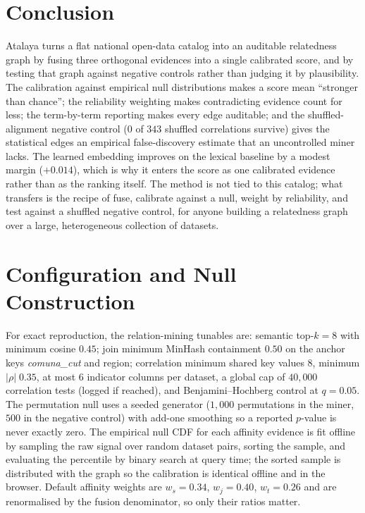 \documentclass[journal]{IEEEtran}
\newcommand{\dsname}[1]{\textit{#1}}
\begin{document}
\section{Conclusion}

Atalaya turns a flat national open-data catalog into an auditable relatedness graph by fusing three orthogonal
evidences into a single calibrated score, and by testing that graph against negative controls rather than
judging it by plausibility. The calibration against empirical null distributions makes a score mean ``stronger
than chance''; the reliability weighting makes contradicting evidence count for less; the term-by-term reporting
makes every edge auditable; and the shuffled-alignment negative control ($0$ of $343$ shuffled correlations
survive) gives the statistical edges an empirical false-discovery estimate that an uncontrolled miner lacks. The
learned embedding improves on the lexical baseline by a modest margin ($+0.014$), which is why it enters the score
as one calibrated evidence rather than as the ranking itself. The method is not tied to this catalog; what
transfers is the recipe of fuse, calibrate against a null, weight by reliability, and test against a shuffled
negative control, for anyone building a relatedness graph over a large, heterogeneous collection of datasets.

\appendices

\section{Configuration and Null Construction}\label{app:config}

For exact reproduction, the relation-mining tunables are: semantic top-$k=8$ with minimum cosine $0.45$; join
minimum MinHash containment $0.50$ on the anchor keys \dsname{comuna\_cut} and region; correlation minimum shared
key values $8$, minimum $|\rho|\;0.35$, at most $6$ indicator columns per dataset, a global cap of $40{,}000$
correlation tests (logged if reached), and Benjamini--Hochberg control at $q=0.05$. The permutation null uses a
seeded generator ($1{,}000$ permutations in the miner, $500$ in the negative control) with add-one smoothing so a
reported $p$-value is never exactly zero. The empirical null CDF for each affinity evidence is fit offline by
sampling the raw signal over random dataset pairs, sorting the sample, and evaluating the percentile by binary
search at query time; the sorted sample is distributed with the graph so the calibration is identical offline and in
the browser. Default affinity weights are $w_s=0.34$, $w_j=0.40$, $w_t=0.26$ and are renormalised by the fusion
denominator, so only their ratios matter.
\end{document}
